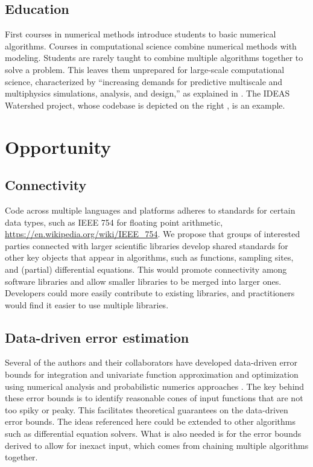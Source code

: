\documentclass{amsart}
\begin{document}
\subsection{Education} 
First courses in numerical methods \cite{BurFaiBur16a} introduce students to  basic numerical algorithms.  Courses in computational science \cite{HolEic19a,ShifShif14a} combine numerical methods with modeling.  Students are rarely taught to combine multiple algorithms together to solve a problem.  This leaves them unprepared for  large-scale computational science, characterized by  ``increasing demands for predictive multiscale and multiphysics simulations, analysis, and design,'' as explained in \cite{IDEASAbout}.  The IDEAS Watershed project, whose codebase is depicted on the right \cite{IDEASWatershedPict}, is an example.

   







\section{Opportunity} %
\subsection{Connectivity} 
Code across multiple languages and platforms adheres to standards for certain data types, such as IEEE 754 for floating point arithmetic, \url{https://en.wikipedia.org/wiki/IEEE_754}.  We propose that groups of interested parties connected with larger scientific libraries develop shared standards for other key objects that appear in algorithms, such as functions, sampling sites, and (partial) differential equations. This would promote connectivity among software libraries and allow smaller libraries to be merged into larger ones.  Developers could more easily contribute to existing libraries, and practitioners would find it easier to use multiple libraries.

\subsection{Data-driven error estimation} 
Several of the authors and their collaborators have developed data-driven error bounds for integration and univariate function approximation and optimization using numerical analysis and probabilistic numerics approaches \cite{ChoEtal17a, HicEtal14b, HicEtal14a, HicJim16a, RatHic19a,JimHic16a}.  The key behind these error bounds is to identify reasonable cones of input functions that are not too spiky or peaky.  This facilitates theoretical guarantees on the data-driven error bounds.  The ideas referenced here could be extended to other algorithms such as differential equation solvers.  What is also needed is for the error bounds derived to allow for inexact input, which comes from chaining multiple algorithms together.
\end{document}
